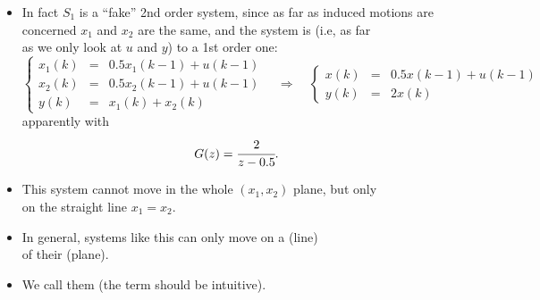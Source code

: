 \begin{frame}
\myPause
 \begin{itemize}[<+-| alert@+>]
 \item In fact $S_1$ is a ``fake'' 2nd order system, since as far as induced motions are\\
       concerned  $x_1$ and $x_2$ are the same, and the system is  (i.e, as far\\
       as we only look at $u$ and $y$)  to a 1st order one:
       \begin{displaymath}
        \left\{\begin{array}{rcl}
         x_1(k) &=& 0.5x_1(k-1)+u(k-1)\\
         x_2(k) &=& 0.5x_2(k-1)+u(k-1)\\
         y(k)   &=& x_1(k)+x_2(k)
        \end{array}\right. \quad
        \Rightarrow \quad
        \left\{\begin{array}{rcl}
         x(k) &=& 0.5x(k-1)+u(k-1)\\
         y(k) &=& 2x(k)
        \end{array}\right.
        \end{displaymath} 
        apparently with
        \begin{displaymath}
         G(z)=\cfrac{2}{z-0.5}.
        \end{displaymath} 
 \item This system cannot move in the whole $(x_1,x_2)$ plane, but only\\
       on the straight line $x_1=x_2$.
 \item In general, systems like this can only move on a  (line)\\
       of their  (plane).
 \item We call them  (the term should be intuitive).
 \end{itemize}
\end{frame}

